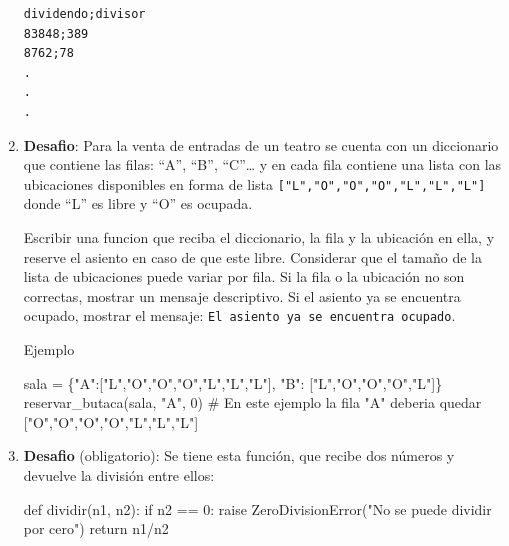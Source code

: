 \documentclass[
  letterpaper,
  DIV=11,
  numbers=noendperiod]{scrreprt}
\newenvironment{Shaded}{\begin{snugshade}}{\end{snugshade}}
\newcommand{\CommentTok}[1]{\textcolor[rgb]{0.37,0.37,0.37}{#1}}
\newcommand{\ControlFlowTok}[1]{\textcolor[rgb]{0.00,0.23,0.31}{#1}}
\newcommand{\DecValTok}[1]{\textcolor[rgb]{0.68,0.00,0.00}{#1}}
\newcommand{\KeywordTok}[1]{\textcolor[rgb]{0.00,0.23,0.31}{#1}}
\newcommand{\NormalTok}[1]{\textcolor[rgb]{0.00,0.23,0.31}{#1}}
\newcommand{\OperatorTok}[1]{\textcolor[rgb]{0.37,0.37,0.37}{#1}}
\newcommand{\PreprocessorTok}[1]{\textcolor[rgb]{0.68,0.00,0.00}{#1}}
\newcommand{\StringTok}[1]{\textcolor[rgb]{0.13,0.47,0.30}{#1}}
\begin{document}
\begin{enumerate}
\begin{verbatim}
dividendo;divisor
83848;389
8762;78
.
.
.
\end{verbatim}
\item
  \textbf{Desafio}: Para la venta de entradas de un teatro se cuenta con
  un diccionario que contiene las filas: ``A'', ``B'', ``C''\ldots{} y
  en cada fila contiene una lista con las ubicaciones disponibles en
  forma de lista \texttt{{[}"L","O","O","O","L","L","L"{]}} donde ``L''
  es libre y ``O'' es ocupada.~

  Escribir una funcion que reciba el diccionario, la fila y la ubicación
  en ella, y reserve el asiento en caso de que este libre. Considerar
  que el tamaño de la lista de ubicaciones puede variar por fila. Si la
  fila o la ubicación no son correctas, mostrar un mensaje descriptivo.
  Si el asiento ya se encuentra ocupado, mostrar el mensaje:
  \texttt{El\ asiento\ ya\ se\ encuentra\ ocupado}.

  Ejemplo

\begin{Shaded}
\begin{Highlighting}[]
\NormalTok{sala }\OperatorTok{=}\NormalTok{ \{}\StringTok{"A"}\NormalTok{:[}\StringTok{"L"}\NormalTok{,}\StringTok{"O"}\NormalTok{,}\StringTok{"O"}\NormalTok{,}\StringTok{"O"}\NormalTok{,}\StringTok{"L"}\NormalTok{,}\StringTok{"L"}\NormalTok{,}\StringTok{"L"}\NormalTok{], }\StringTok{"B"}\NormalTok{: [}\StringTok{"L"}\NormalTok{,}\StringTok{"O"}\NormalTok{,}\StringTok{"O"}\NormalTok{,}\StringTok{"O"}\NormalTok{,}\StringTok{"L"}\NormalTok{]\}}
\NormalTok{reservar\_butaca(sala, }\StringTok{"A"}\NormalTok{, }\DecValTok{0}\NormalTok{)}
\CommentTok{\# En este ejemplo la fila "A" deberia quedar ["O","O","O","O","L","L","L"]}
\end{Highlighting}
\end{Shaded}
\item
  \textbf{Desafio} (obligatorio): Se tiene esta función, que recibe dos
  números y devuelve la división entre ellos:

\begin{Shaded}
\begin{Highlighting}[]
\KeywordTok{def}\NormalTok{ dividir(n1, n2):}
    \ControlFlowTok{if}\NormalTok{ n2 }\OperatorTok{==} \DecValTok{0}\NormalTok{:}
        \ControlFlowTok{raise} \PreprocessorTok{ZeroDivisionError}\NormalTok{(}\StringTok{"No se puede dividir por cero"}\NormalTok{)}
    \ControlFlowTok{return}\NormalTok{ n1}\OperatorTok{/}\NormalTok{n2}
\end{Highlighting}
\end{Shaded}


\end{enumerate}
\end{document}
